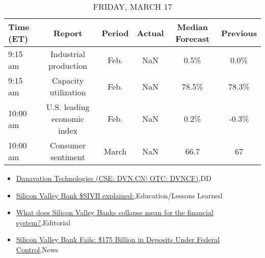 \documentclass{article}%
\begin{document}
%


\begin{table}[htbp]%
\caption{FRIDAY, MARCH 17}%
\centering%
\begin{adjustbox}{width=1\textwidth}%
\begin{tabular}{lccccc}
\toprule
Time (ET) &                      Report & Period & Actual & Median Forecast & Previous \\
\midrule
  9:15 am &       Industrial production &   Feb. &    NaN &            0.5\% &     0.0\% \\
  9:15 am &        Capacity utilization &   Feb. &    NaN &           78.5\% &    78.3\% \\
 10:00 am & U.S. leading economic index &   Feb. &    NaN &            0.2\% &    -0.3\% \\
 10:00 am &          Consumer sentiment &  March &    NaN &            66.7 &       67 \\
\bottomrule
\end{tabular}
%
\end{adjustbox}%
\end{table}

%
\begin{itemize}%
\item%
\href{https://reddit.com/r/Baystreetbets/comments/11ns7sf/danavation\_technologies\_cse\_dvncn\_otc\_dvncf/}{Danavation Technologies (CSE: DVN.CN| OTC: DVNCF)},DD%
\item%
\href{https://reddit.com/r/StockMarket/comments/11ody5h/silicon\_valley\_bank\_sivb\_explained/}{Silicon Valley Bank \$SIVB explained:},Education/Lessons Learned%
\item%
\href{https://reddit.com/r/Economics/comments/11o8sck/what\_does\_silicon\_valley\_banks\_collapse\_mean\_for/}{What does Silicon Valley Banks collapse mean for the financial system?},Editorial%
\item%
\href{https://reddit.com/r/Economics/comments/11o86jp/silicon\_valley\_bank\_fails\_175\_billion\_in\_deposits/}{Silicon Valley Bank Fails: \$175 Billion in Deposits Under Federal Control},News%
\end{itemize}%
\end{document}
